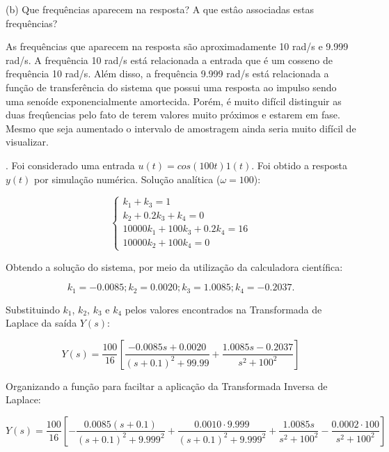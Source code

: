 \documentclass[10pt]{article}
\begin{document}
(b) Que frequências aparecem na resposta? A que estâo associadas estas frequências?

\quad As frequências que aparecem na resposta são aproximadamente 10 rad/s e 9.999 rad/s.
A frequência 10 rad/s está relacionada a entrada que é um cosseno de frequência 10 rad/s.
Além disso, a frequência 9.999 rad/s está relacionada a função de transferência do sistema
que possui uma resposta ao impulso sendo uma senoíde exponencialmente amortecida.
Porém, é muito difícil distinguir as duas freqûencias pelo fato de terem valores muito próximos e
estarem em fase. Mesmo que seja aumentado o intervalo de amostragem ainda seria muito difícil de visualizar.

\newpage

. Foi considerado uma entrada $u(t) = cos(100 t) 1(t)$. Foi obtido a resposta $y(t)$ por simulação numérica. Solução analítica ($\omega = 100$):

\begin{equation}
    \left\{
    \begin{array}{l}
        k_1 + k_3 = 1 \\
        k_2 + 0.2k_3 +k_4 = 0 \\
        10000k_1 + 100k_3 + 0.2k_4 = 16 \\
        10000k_2 + 100k_4 = 0
    \end{array}
    \right. 
\end{equation}

\quad Obtendo a solução do sistema, por meio da utilização da calculadora científica:

\begin{equation}
    k_1 = -0.0085; k_2 = 0.0020; k_3 = 1.0085; k_4 = -0.2037.
\end{equation}

\quad Substituindo $k_1$, $k_2$, $k_3$ e $k_4$ pelos valores encontrados na Transformada de Laplace da saída $Y(s)$:

\begin{equation}
    Y(s) = \frac{100}{16} \left[ \frac{-0.0085s+0.0020}{(s + 0.1)^2 + 99.99} + \frac{1.0085s -0.2037}{s^2 + 100^2} \right]
\end{equation}

\quad Organizando a função para faciltar a aplicação da Transformada Inversa de Laplace:

\begin{equation}
    Y(s) = \frac{100}{16} \left[-\frac{0.0085(s + 0.1)}{(s + 0.1)^2 + 9.999^2} + \frac{0.0010 \cdot 9.999}{(s + 0.1)^2 + 9.999^2} + \frac{1.0085s}{s^2 + 100^2} - \frac{0.0002 \cdot 100}{s^2 + 100^2} \right]
\end{equation}
\end{document}

